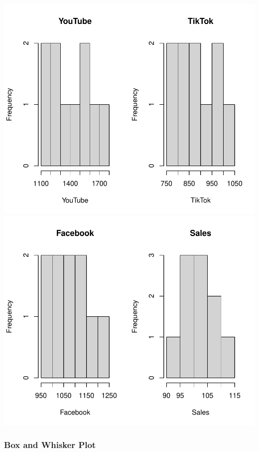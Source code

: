 \documentclass[
]{article}
\begin{document}
\includegraphics{2_multiple_linear_regression_files/figure-latex/visualization_histogram-1.pdf}
\includegraphics{2_multiple_linear_regression_files/figure-latex/visualization_histogram-2.pdf}

\subsubsection{\texorpdfstring{\textbf{Box and Whisker
Plot}}{Box and Whisker Plot}}\label{box-and-whisker-plot}
\end{document}
